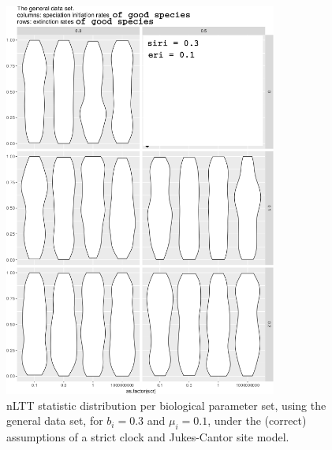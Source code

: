 \documentclass{article}
\begin{document}
\begin{figure}[!htbp]
  \includegraphics[width=0.8\textwidth]{fig_general_2.png}
  \caption{
    nLTT statistic distribution per biological parameter set, using the
    general data set, 
    for $b_i = 0.3$ and $\mu_i = 0.1$, 
    under the (correct) assumptions of a strict clock and Jukes-Cantor site model.
  }
\end{figure}
\end{document}
